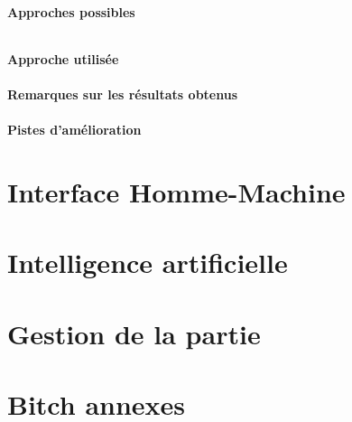 \documentclass{scratcl}
\begin{document}
    \subsection{Approches possibles}

    \paragraph{}

    \subsection{Approche utilisée}

    \subsection{Remarques sur les résultats obtenus}

    \subsection{Pistes d'amélioration}





    \part{Interface Homme-Machine}
    \section{}
    \subsection{}
    \paragraph{}

    \part{Intelligence artificielle}

    \part{Gestion de la partie}

    \part{Bitch annexes}
\end{document}
